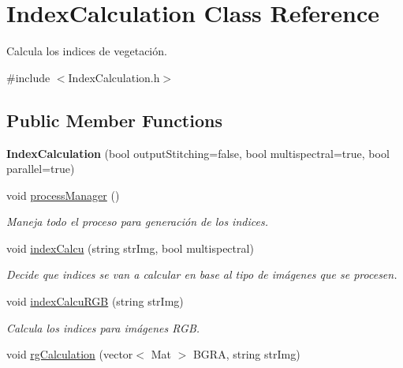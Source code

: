 \hypertarget{classIndexCalculation}{}\section{Index\+Calculation Class Reference}
\label{classIndexCalculation}


Calcula los indices de vegetación.  




{\ttfamily \#include $<$Index\+Calculation.\+h$>$}

\subsection*{Public Member Functions}
\begin{DoxyCompactItemize}
\item 
\mbox{\label{classIndexCalculation_acf1a471a4fc36510f3f2f629846ba3b8}} 
{\bfseries Index\+Calculation} (bool output\+Stitching=false, bool multispectral=true, bool parallel=true)
\item 
\mbox{\label{classIndexCalculation_a4890d5b4758672dfba23830b59b18892}} 
void \mbox{\hyperlink{classIndexCalculation_a4890d5b4758672dfba23830b59b18892}{process\+Manager}} ()
\begin{DoxyCompactList}\small\item\em Maneja todo el proceso para generación de los indices. \end{DoxyCompactList}\item 
void \mbox{\hyperlink{classIndexCalculation_a07039b532b218e5cfe1e603966017373}{index\+Calcu}} (string str\+Img, bool multispectral)
\begin{DoxyCompactList}\small\item\em Decide que indices se van a calcular en base al tipo de imágenes que se procesen. \end{DoxyCompactList}\item 
void \mbox{\hyperlink{classIndexCalculation_a7070ce3aebd8abd71074270eff8f88b6}{index\+Calcu\+R\+GB}} (string str\+Img)
\begin{DoxyCompactList}\small\item\em Calcula los indices para imágenes R\+GB. \end{DoxyCompactList}\item 
void \mbox{\hyperlink{classIndexCalculation_a562111a1b8920fa0136811ecd7e51e36}{rg\+Calculation}} (vector$<$ Mat $>$ B\+G\+RA, string str\+Img)

\end{DoxyCompactItemize}

